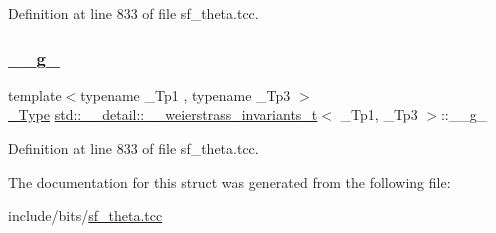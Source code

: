 Definition at line 833 of file sf\+\_\+theta.\+tcc.

\mbox{\label{structstd_1_1____detail_1_1____weierstrass__invariants__t_a585d9c21b0b189782b58f121cd101289}} 
\subsubsection{\texorpdfstring{\+\_\+\+\_\+g\+\_}{\_\_g\_3}}
{\footnotesize\ttfamily template$<$typename \+\_\+\+Tp1 , typename \+\_\+\+Tp3 $>$ \\
\hyperlink{structstd_1_1____detail_1_1____weierstrass__invariants__t_a9992ab3f07a514203487c0760d76173f}{\+\_\+\+Type} \hyperlink{structstd_1_1____detail_1_1____weierstrass__invariants__t}{std\+::\+\_\+\+\_\+detail\+::\+\_\+\+\_\+weierstrass\+\_\+invariants\+\_\+t}$<$ \+\_\+\+Tp1, \+\_\+\+Tp3 $>$\+::\+\_\+\+\_\+g\+\_}



Definition at line 833 of file sf\+\_\+theta.\+tcc.



The documentation for this struct was generated from the following file\+:\begin{DoxyCompactItemize}
\item 
include/bits/\hyperlink{sf__theta_8tcc}{sf\+\_\+theta.\+tcc}\end{DoxyCompactItemize}

